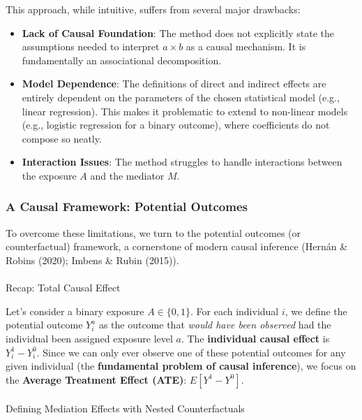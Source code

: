 \documentclass[
  10pt,
  letterpaper,
  DIV=11,
  numbers=noendperiod,
  oneside]{scrartcl}
\makeatletter
\let\oldparagraph\paragraph
\renewcommand{\paragraph}{
    \@ifstar
      \xxxParagraphStar
      \xxxParagraphNoStar
  }
\newcommand{\xxxParagraphStar}[1]{\oldparagraph*{#1}\mbox{}}
\newcommand{\xxxParagraphNoStar}[1]{\oldparagraph{#1}\mbox{}}
\providecommand{\tightlist}{%
  \setlength{\itemsep}{0pt}\setlength{\parskip}{0pt}}
\makeatother
\begin{document}
This approach, while intuitive, suffers from several major drawbacks:

\begin{itemize}
\tightlist
\item
  \textbf{Lack of Causal Foundation}: The method does not explicitly
  state the assumptions needed to interpret \(a \times b\) as a causal
  mechanism. It is fundamentally an associational decomposition.
\item
  \textbf{Model Dependence}: The definitions of direct and indirect
  effects are entirely dependent on the parameters of the chosen
  statistical model (e.g., linear regression). This makes it problematic
  to extend to non-linear models (e.g., logistic regression for a binary
  outcome), where coefficients do not compose so neatly.
\item
  \textbf{Interaction Issues}: The method struggles to handle
  interactions between the exposure \(A\) and the mediator \(M\).
\end{itemize}

\subsubsection{A Causal Framework: Potential
Outcomes}\label{a-causal-framework-potential-outcomes}

To overcome these limitations, we turn to the potential outcomes (or
counterfactual) framework, a cornerstone of modern causal inference
(Hernán \& Robins (2020); Imbens \& Rubin (2015)).

\paragraph{Recap: Total Causal Effect}\label{recap-total-causal-effect}

Let's consider a binary exposure \(A \in \{0, 1\}\). For each individual
\(i\), we define the potential outcome \(Y_i^a\) as the outcome that
\emph{would have been observed} had the individual been assigned
exposure level \(a\). The \textbf{individual causal effect} is
\(Y_i^1 - Y_i^0\). Since we can only ever observe one of these potential
outcomes for any given individual (the \textbf{fundamental problem of
causal inference}), we focus on the \textbf{Average Treatment Effect
(ATE)}: \(E[Y^1 - Y^0]\).

\paragraph{Defining Mediation Effects with Nested
Counterfactuals}\label{defining-mediation-effects-with-nested-counterfactuals}
\end{document}
